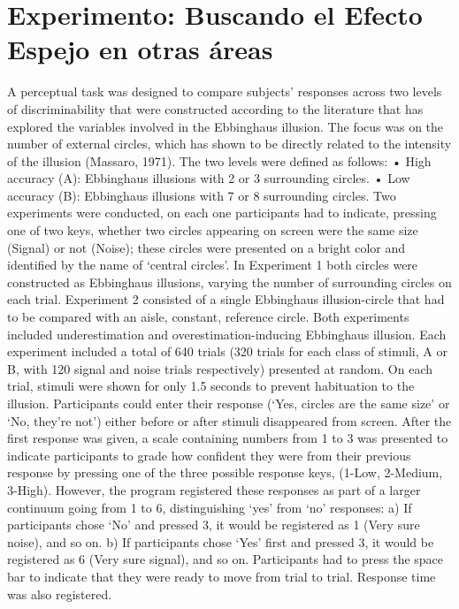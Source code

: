 
\chapter{Experimento: Buscando el Efecto Espejo en otras áreas} %

\label{Cap_Exp} %


A perceptual task was designed to compare subjects’ responses across two levels of discriminability that were constructed according to the literature that has explored the variables involved in the Ebbinghaus illusion. The focus was on the number of external circles, which has shown to be directly related to the intensity of the illusion (Massaro, 1971). The two levels were defined as follows:
• High accuracy (A): Ebbinghaus illusions with 2 or 3 surrounding circles.
• Low accuracy (B): Ebbinghaus illusions with 7 or 8 surrounding circles.
Two experiments were conducted, on each one participants had to indicate, pressing one of two keys, whether two circles appearing on screen were the same size (Signal) or not (Noise); these circles were presented on a bright color and identified by the name of ‘central circles’. In Experiment 1 both circles were constructed as Ebbinghaus illusions, varying the number of surrounding circles on each trial.
Experiment 2 consisted of a single Ebbinghaus illusion-circle that had to be compared with an aisle, constant, reference circle. Both experiments included underestimation and overestimation-inducing Ebbinghaus illusion.
Each experiment included a total of 640 trials (320 trials for each class of stimuli, A or B, with 120 signal and noise trials respectively) presented at random. On each trial, stimuli were shown for only 1.5 seconds to prevent habituation to the illusion. Participants could enter their response (‘Yes, circles are the same size’ or ‘No, they’re not’) either before or after stimuli disappeared from screen.
After the first response was given, a scale containing numbers from 1 to 3 was presented to indicate participants to grade how confident they were from their previous response by pressing one of the three possible response keys, (1-Low, 2-Medium, 3-High). However, the program registered these responses as part of a larger continuum going from 1 to 6, distinguishing ‘yes’ from ‘no’ responses:
a) If participants chose ‘No’ and pressed 3, it would be registered as 1 (Very sure noise), and so on.
b) If participants chose ‘Yes’ first and pressed 3, it would be registered as 6 (Very sure signal), and so on.
Participants had to press the space bar to indicate that they were ready to move from trial to trial. Response time was also registered.


